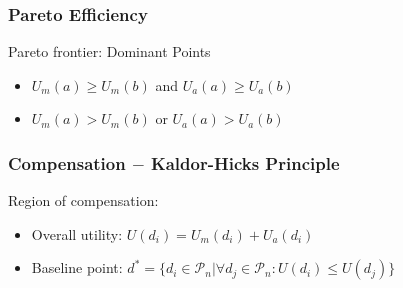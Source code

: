 \documentclass[14pt]{beamer}
\begin{document}
\begin{frame}\frametitle{Pareto Efficiency}

Pareto frontier: Dominant Points

\begin{itemize}
\item $U_m(a)\ge U_m(b)$ and $U_a(a)\ge U_a(b)$
\item $U_m(a) > U_m(b)$ or $U_a(a) > U_a(b)$
\end{itemize}



\end{frame}

\begin{frame}\frametitle{Compensation $-$ Kaldor-Hicks Principle}

Region of compensation:

\begin{itemize}
\item Overall utility: $U(d_i)=U_m(d_i)+U_a(d_i)$
\item Baseline point: $d^*=\{d_i\in\mathcal{P}_n | \forall d_j\in\mathcal{P}_n: U(d_i)\leq U(d_j)\}$
\end{itemize}



\end{frame}
\end{document}
